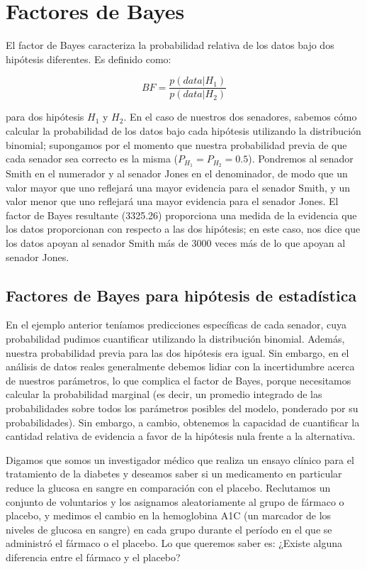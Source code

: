 \documentclass[
  12pt,
]{book}
\theoremstyle{definition}
\theoremstyle{definition}
\theoremstyle{definition}
\theoremstyle{remark}
\begin{document}
\hypertarget{factores-de-bayes}{%
\section{Factores de Bayes}\label{factores-de-bayes}}

El factor de Bayes caracteriza la probabilidad relativa de los datos bajo dos hipótesis diferentes. Es definido como:

\[
BF = \frac{p(data|H_1)}{p(data|H_2)}
\]

para dos hipótesis \(H_1\) y \(H_2\). En el caso de nuestros dos senadores, sabemos cómo calcular la probabilidad de los datos bajo cada hipótesis utilizando la distribución binomial; supongamos por el momento que nuestra probabilidad previa de que cada senador sea correcto es la misma (\(P_{H_1} = P_{H_2} = 0.5\)). Pondremos al senador Smith en el numerador y al senador Jones en el denominador, de modo que un valor mayor que uno reflejará una mayor evidencia para el senador Smith, y un valor menor que uno reflejará una mayor evidencia para el senador Jones. El factor de Bayes resultante (3325.26) proporciona una medida de la evidencia que los datos proporcionan con respecto a las dos hipótesis; en este caso, nos dice que los datos apoyan al senador Smith más de 3000 veces más de lo que apoyan al senador Jones.

\hypertarget{factores-de-bayes-para-hipuxf3tesis-de-estaduxedstica}{%
\subsection{Factores de Bayes para hipótesis de estadística}\label{factores-de-bayes-para-hipuxf3tesis-de-estaduxedstica}}

En el ejemplo anterior teníamos predicciones específicas de cada senador, cuya probabilidad pudimos cuantificar utilizando la distribución binomial. Además, nuestra probabilidad previa para las dos hipótesis era igual. Sin embargo, en el análisis de datos reales generalmente debemos lidiar con la incertidumbre acerca de nuestros parámetros, lo que complica el factor de Bayes, porque necesitamos calcular la probabilidad marginal (es decir, un promedio integrado de las probabilidades sobre todos los parámetros posibles del modelo, ponderado por su probabilidades). Sin embargo, a cambio, obtenemos la capacidad de cuantificar la cantidad relativa de evidencia a favor de la hipótesis nula frente a la alternativa.

Digamos que somos un investigador médico que realiza un ensayo clínico para el tratamiento de la diabetes y deseamos saber si un medicamento en particular reduce la glucosa en sangre en comparación con el placebo. Reclutamos un conjunto de voluntarios y los asignamos aleatoriamente al grupo de fármaco o placebo, y medimos el cambio en la hemoglobina A1C (un marcador de los niveles de glucosa en sangre) en cada grupo durante el período en el que se administró el fármaco o el placebo. Lo que queremos saber es: ¿Existe alguna diferencia entre el fármaco y el placebo?
\end{document}
